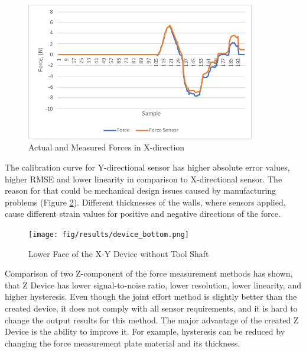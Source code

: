 \begin{figure}[h]
	\begin{center}
	\includegraphics[width=100mm]{fig/results/syst_error.pdf}
	\end{center}
	\vspace{-4mm}
	\caption[Actual and Measured Forces in X-direction]
	{Actual and Measured Forces in X-direction}
	\label{fig:Syst_err}
	\vspace{-2mm}
\end{figure}

The calibration curve for Y-directional sensor has higher absolute error values, higher RMSE and lower linearity in comparison to X-directional sensor. The reason for that could be mechanical design issues caused by manufacturing problems (Figure \ref{fig:Syst_err_expl}). Different thicknesses of the walls, where sensors applied, cause different strain values for positive and negative directions of the force.

\begin{figure}[h]
	\begin{center}
	\texttt{[image: fig/results/device\_bottom.png]}
	\end{center}
	\vspace{-4mm}
	\caption[Lower Face of the X-Y Device without Tool Shaft]
	{Lower Face of the X-Y Device without Tool Shaft}
	\label{fig:Syst_err_expl}
	\vspace{-2mm}
\end{figure}

	Comparison of two Z-component of the force measurement methods has shown, that Z Device has lower signal-to-noise ratio, lower resolution, lower linearity, and higher hysteresis. Even though the joint effort method is slightly better than the created device, it does not comply with all sensor requirements, and it is hard to change the output results for this method. The major advantage of the created Z Device is the ability to improve it. For example, hysteresis can be reduced by changing the force measurement plate material and its thickness.

